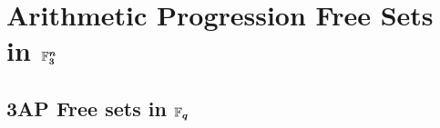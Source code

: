 \section{Arithmetic Progression Free Sets in \texorpdfstring{$\boldsymbol{\mathbb{F}_3^n}$}{Fqn}}
\subsection{\textsc{3AP} Free sets in \texorpdfstring{$\boldsymbol{\mathbb{F}_q}$}{Fq}}